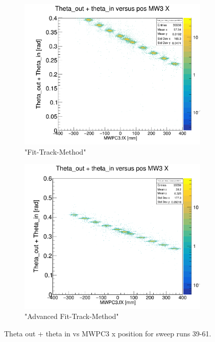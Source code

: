 \documentclass[12pt, letterpaper]{article}
\begin{document}
\begin{figure}[!htbp]
\begin{subfigure}{.5\textwidth}
  \label{fig:sub-second}
\end{subfigure}
\begin{subfigure}{.5\textwidth}
  \centering
  \includegraphics[width=.9\linewidth]{plot_imgs/theta_out_theta_in_mw3_fit.png} 
  \caption{"Fit-Track-Method"}
  \label{fig:sub-second}
\end{subfigure}
\begin{subfigure}{.5\textwidth}
  \centering
  \includegraphics[width=.9\linewidth]{plot_imgs/theta_out_theta_in_mw3_alpha.png} 
  \caption{"Advanced Fit-Track-Method"}
  \label{fig:sub-second}
\end{subfigure}
\caption{Theta \textunderscore out + theta \textunderscore in vs MWPC3 x position for sweep runs 39-61.}
\label{fig:fig}
\end{figure}
\FloatBarrier
\clearpage
\end{document}
